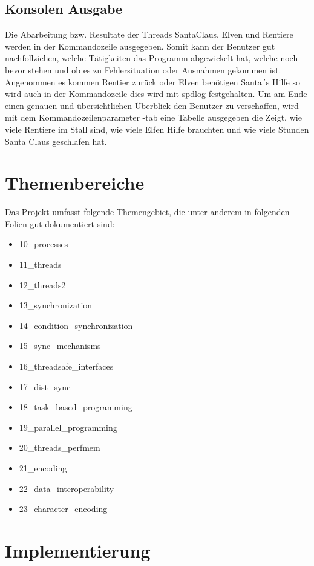 \documentclass[a4paper,12pt]{exam}
\begin{document}
\subsection{Konsolen Ausgabe}
Die Abarbeitung bzw. Resultate der Threads SantaClaus, Elven und Rentiere werden in der Kommandozeile ausgegeben. Somit kann der Benutzer gut nachfollziehen, welche Tätigkeiten das Programm abgewickelt hat, welche noch bevor stehen und
ob es zu Fehlersituation oder Ausnahmen gekommen ist. Angenommen es kommen Rentier zurück oder Elven benötigen Santa´s Hilfe so wird auch in der Kommandozeile dies wird mit spdlog festgehalten. Um am Ende einen genauen und übersichtlichen 
Überblick den Benutzer zu verschaffen, wird mit dem Kommandozeilenparameter -tab eine Tabelle ausgegeben die Zeigt, wie viele Rentiere im Stall sind, wie viele Elfen Hilfe brauchten und wie viele Stunden Santa Claus geschlafen hat.
\newpage

\section{Themenbereiche}
Das Projekt umfasst folgende Themengebiet, die unter anderem in folgenden Folien gut dokumentiert sind:
    \begin{itemize}
        \item  10\_processes
        \item  11\_threads
        \item  12\_threads2 
        \item  13\_synchronization 
        \item  14\_condition\_synchronization 
        \item  15\_sync\_mechanisms 
        \item  16\_threadsafe\_interfaces 
        \item  17\_dist\_sync 
        \item  18\_task\_based\_programming 
        \item  19\_parallel\_programming 
        \item  20\_threads\_perfmem
        \item  21\_encoding
        \item  22\_data\_interoperability
        \item  23\_character\_encoding
    \end{itemize} 
\newpage
\section{Implementierung}
\end{document}
